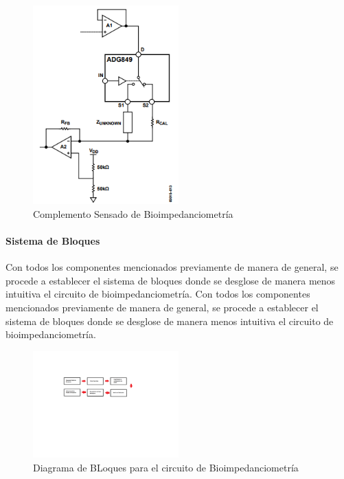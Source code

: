 \documentclass[12pt,letterpaper,spanish]{article}
\begin{document}
			\begin{figure}[H]
				\centering
				\includegraphics[width=0.5\textwidth]{./Imagenes/Anexo_Bio.png}
				\caption{Complemento Sensado de Bioimpedanciometría}
			\end{figure}
			
				\paragraph{Sistema de Bloques}
				\hfill\break
			Con todos los componentes mencionados previamente de manera de general, se procede a establecer el sistema de bloques donde se desglose de manera menos intuitiva el circuito de bioimpedanciometría. Con todos los componentes mencionados previamente de manera de general, se procede a establecer el sistema de bloques donde se desglose de manera menos intuitiva el circuito de bioimpedanciometría. 

				\begin{figure}[H]
					\centering
					\includegraphics[width=0.5\textwidth]{./Imagenes/Diagrama de Bloques.png}
					\caption{Diagrama de BLoques para el circuito de Bioimpedanciometría}
				\end{figure}
			
\end{document}
